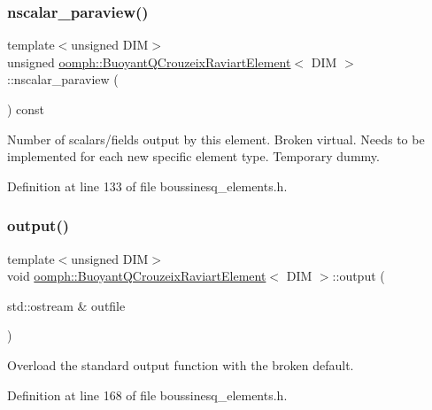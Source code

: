 \subsubsection{\texorpdfstring{nscalar\+\_\+paraview()}{nscalar\_paraview()}}
{\footnotesize\ttfamily template$<$unsigned D\+IM$>$ \\
unsigned \hyperlink{classoomph_1_1BuoyantQCrouzeixRaviartElement}{oomph\+::\+Buoyant\+Q\+Crouzeix\+Raviart\+Element}$<$ D\+IM $>$\+::nscalar\+\_\+paraview (\begin{DoxyParamCaption}{ }\end{DoxyParamCaption}) const\hspace{0.3cm}{\ttfamily [inline]}}



Number of scalars/fields output by this element. Broken virtual. Needs to be implemented for each new specific element type. Temporary dummy. 



Definition at line 133 of file boussinesq\+\_\+elements.\+h.

\mbox{\label{classoomph_1_1BuoyantQCrouzeixRaviartElement_a3817706dbf3c755b4029917dac80bad7}} 
\subsubsection{\texorpdfstring{output()}{output()}\hspace{0.1cm}{\footnotesize\ttfamily [1/4]}}
{\footnotesize\ttfamily template$<$unsigned D\+IM$>$ \\
void \hyperlink{classoomph_1_1BuoyantQCrouzeixRaviartElement}{oomph\+::\+Buoyant\+Q\+Crouzeix\+Raviart\+Element}$<$ D\+IM $>$\+::output (\begin{DoxyParamCaption}\item[{std\+::ostream \&}]{outfile }\end{DoxyParamCaption})\hspace{0.3cm}{\ttfamily [inline]}}



Overload the standard output function with the broken default. 



Definition at line 168 of file boussinesq\+\_\+elements.\+h.


